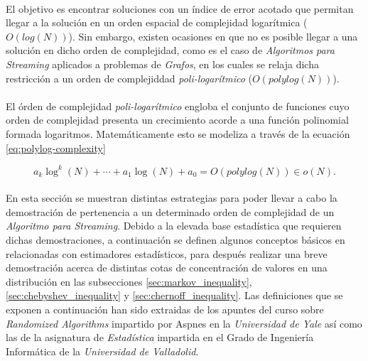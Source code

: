 \documentclass{subfiles}
\begin{document}
      \paragraph{}
      El objetivo es encontrar soluciones con un índice de error acotado que permitan llegar a la solución en un orden espacial de complejidad logarítmica ($O(log(N))$). Sin embargo, existen ocasiones en que no es posible llegar a una solución en dicho orden de complejidad, como es el caso de \emph{Algoritmos para Streaming} aplicados a problemas de \emph{Grafos}, en los cuales se relaja dicha restricción a un orden de complejiddad \emph{poli-logarítmico} ($O(polylog(N))$).

      \paragraph{}
      El órden de complejidad \emph{poli-logarítmico} engloba el conjunto de funciones cuyo orden de complejidad presenta un crecimiento acorde a una función polinomial formada logaritmos. Matemáticamente esto se modeliza a través de la ecuación \eqref{eq:polylog-complexity}

      \begin{equation}
      \label{eq:polylog-complexity}
        a_{k}\log ^{k}(N)+\cdots +a_{1}\log(N)+a_{0} = O(polylog(N)) \in o(N).
      \end{equation}

      \paragraph{}
      En esta sección se muestran distintas estrategias para poder llevar a cabo la demostración de pertenencia a un determinado orden de complejidad de un \emph{Algoritmo para Streaming}. Debido a la elevada base estadística que requieren dichas demostraciones, a continuación se definen algunos conceptos básicos en relacionadas con estimadores estadísticos, para después realizar una breve demostración acerca de distintas cotas de concentración de valores en una distribución en las subsecciones \ref{sec:markov_inequality}, \ref{sec:chebyshev_inequality} y \ref{sec:chernoff_inequality}. Las definiciones que se exponen a continuación han sido extraidas de los apuntes del curso sobre \emph{Randomized Algorithms} \cite{aspnes2014notes} impartido por Aspnes en la \emph{Universidad de Yale} así como las de la asignatura de \emph{Estadística}\cite{estadistica2016notes} impartida en el Grado de Ingeniería Informática de la \emph{Universidad de Valladolid}.
\end{document}
